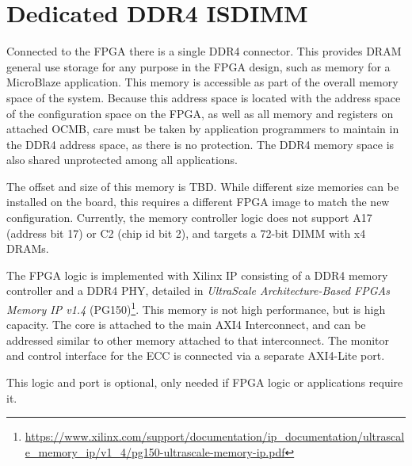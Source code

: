 \section{Dedicated DDR4 ISDIMM} \label{section_isdimm}

Connected to the FPGA there is a single DDR4 connector. This provides
DRAM general use storage for any purpose in the FPGA design, such as
memory for a MicroBlaze application. This memory is accessible as part
of the overall memory space of the system. Because this address space
is located with the address space of the configuration space on the
FPGA, as well as all memory and registers on attached OCMB, care must
be taken by application programmers to maintain in the DDR4 address
space, as there is no protection. The DDR4 memory space is also shared
unprotected among all applications.

The offset and size of this memory is TBD. While different size
memories can be installed on the board, this requires a different FPGA
image to match the new configuration. Currently, the memory controller
logic does not support A17 (address bit 17) or C2 (chip id bit 2), and
targets a 72-bit DIMM with x4 DRAMs.

The FPGA logic is implemented with Xilinx IP consisting of a DDR4
memory controller and a DDR4 PHY, detailed in \textit{UltraScale
Architecture-Based FPGAs Memory IP v1.4}
(PG150)\footnote{\url{https://www.xilinx.com/support/documentation/ip\_documentation/ultrascale\_memory\_ip/v1\_4/pg150-ultrascale-memory-ip.pdf}}.
This memory is not high performance, but is high capacity. The core is
attached to the main AXI4 Interconnect, and can be addressed similar
to other memory attached to that interconnect. The monitor and control
interface for the ECC is connected via a separate AXI4-Lite port.

This logic and port is optional, only needed if FPGA logic or
applications require it.
